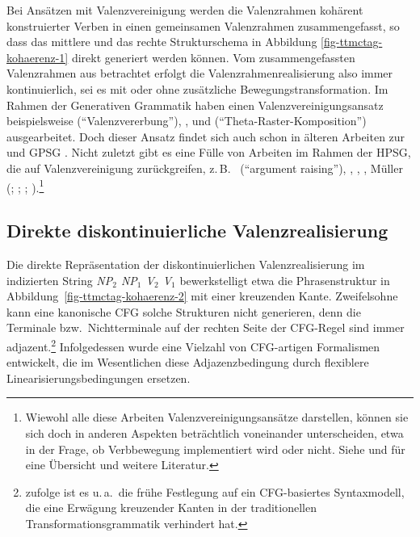 Bei Ansätzen mit Valenzvereinigung werden die Valenzrahmen kohärent konstruierter Verben in einen gemeinsamen Valenzrahmen zusammengefasst, so dass das mittlere und das rechte Strukturschema in Abbildung \ref{fig-ttmctag-kohaerenz-1} direkt generiert werden können. Vom zusammengefassten Valenzrahmen aus betrachtet erfolgt die Valenzrahmenrealisierung also immer kontinuierlich, sei es mit oder ohne zusätzliche Bewegungstransformation. Im Rahmen der Generativen Grammatik haben einen Valenzvereinigungsansatz beispielsweise \cite{Jacobs:92} ("`Valenzvererbung"'), \citet[Abschnitt~9.6.2.2]{Haider:93}, \cite{Wurmbrand:01} und \citet[Kapitel~5]{Sternefeld:06} ("`Theta-Raster-Komposition"') ausgearbeitet. Doch dieser Ansatz findet sich auch schon in älteren Arbeiten zur  \citep{Geach:70,Steedman:85} und GPSG \citep{Johnson:86}. Nicht zuletzt gibt es eine Fülle von Arbeiten im Rahmen der HPSG, die auf Valenzvereinigung zurückgreifen, z.\,B.\ \cite{Hinrichs:Nakazawa:89,Hinrichs:Nakazawa:94} ("`argument raising"'), \cite{Nerbonne:94}, \cite{Pollard:96}, \cite{Meurers:99}, Müller (\citeyear[Kapitel~17--18]{Mueller:99}; \citeyear[Chapter~2]{Mueller:02}; \citeyear{Mueller:05}; \citeyear{Mueller:09}).\footnote{Wiewohl alle diese Arbeiten Valenzvereinigungsansätze darstellen, können sie sich doch in anderen Aspekten beträchtlich voneinander unterscheiden, etwa in der Frage, ob Verbbewegung implementiert wird oder nicht. Siehe \cite{Meurers:99b} und \cite{Mueller:05} für eine Übersicht und weitere Literatur.}


\subsection{Direkte diskontinuierliche Valenzrealisierung} \label{sec-kohaerenz-strategien-direkt}

Die direkte Repräsentation der diskontinuierlichen Valenzrealisierung im indizierten String {\it NP$_2$ NP$_1$ V$_2$ V$_1$} bewerkstelligt etwa die Phrasenstruktur in Abbildung~\ref{fig-ttmctag-kohaerenz-2} mit einer kreuzenden Kante. Zweifelsohne kann eine kanonische CFG solche Strukturen nicht generieren, denn die Terminale bzw.\ Nichtterminale auf der rechten Seite der CFG-Regel sind immer adjazent.\footnote{\cite{McCawley:82} zufolge ist es u.\,a.\ die frühe Festlegung auf ein CFG-basiertes Syntaxmodell, die eine Erwägung kreuzender Kanten in der traditionellen Transformationsgrammatik verhindert hat.} Infolgedessen wurde eine Vielzahl von CFG-artigen Formalismen entwickelt, die im Wesentlichen diese Adjazenzbedingung durch flexiblere Linearisierungsbedingungen ersetzen.    

